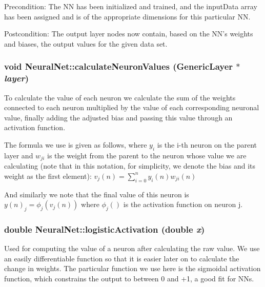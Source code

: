 \begin{Desc}
\item[Precondition:]The NN has been initialized and trained, and the inputData array has been assigned and is of the appropriate dimensions for this particular NN. \end{Desc}
\begin{Desc}
\item[Postcondition:]The output layer nodes now contain, based on the NN's weights and biases, the output values for the given data set. \end{Desc}
\hypertarget{classNeuralNet_f36ed795560a187aaafc86b82348ae05}{
\subsubsection{\setlength{\rightskip}{0pt plus 5cm}void NeuralNet::calculateNeuronValues ({\bf GenericLayer} $\ast$ {\em layer})}}
\label{classNeuralNet_f36ed795560a187aaafc86b82348ae05}


To calculate the value of each neuron we calculate the sum of the weights connected to each neuron multiplied by the value of each corresponding neuronal value, finally adding the adjusted bias and passing this value through an activation function.

The formula we use is given as follows, where $y_i$ is the i-th neuron on the parent layer and $w_{ji}$ is the weight from the parent to the neuron whose value we are calculating (note that in this notation, for simplicity, we denote the bias and its weight as the first element): $\displaystyle v_j(n) = \sum_{i=0}^n y_i(n)w_{ji}(n)$

And similarly we note that the final value of this neuron is $y(n)_j = \phi_j(v_j(n))$ where $\phi_j()$ is the activation function on neuron j. \hypertarget{classNeuralNet_8a49e8b1bf5710e27c57b322ee3bc323}{
\subsubsection{\setlength{\rightskip}{0pt plus 5cm}double NeuralNet::logisticActivation (double {\em x})}}
\label{classNeuralNet_8a49e8b1bf5710e27c57b322ee3bc323}


Used for computing the value of a neuron after calculating the raw value. We use an easily differentiable function so that it is easier later on to calculate the change in weights. The particular function we use here is the sigmoidal activation function, which constrains the output to between 0 and +1, a good fit for NNs.

